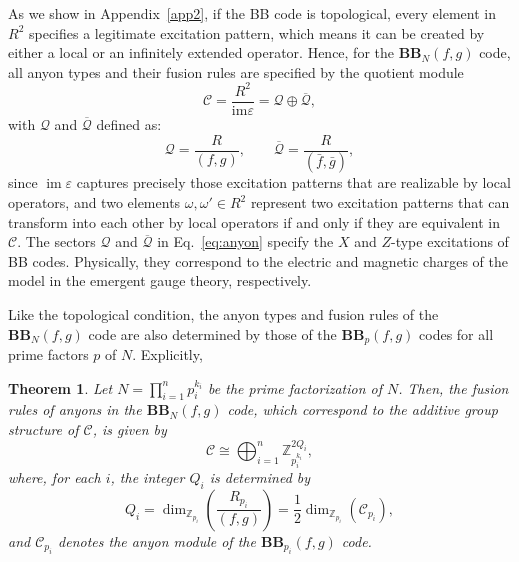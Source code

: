 \documentclass[aps,prb,english,superscriptaddress,twocolumn,tightenlines,showpacs,longbibliography,floatfix,amsfonts]{revtex4-2}
\newcommand{\im}{\operatorname{im}}
\newcommand{\eps}{\varepsilon}
\newtheorem{thm}{Theorem}
\begin{document}
As we show in Appendix~\ref{app2}, if the BB code is topological, every element in $R^2$ specifies a legitimate excitation pattern,  which means it can be created by either a local or an infinitely extended operator. Hence, for the $\mathbf{BB}_N(f,g)$ code, all anyon types and their fusion rules are specified by the quotient module
\begin{equation}
    \mathcal{C}=\frac{R^{2}}{\mathrm{im}\eps}=\mathcal{Q}\oplus\overline{\mathcal{Q}},\label{eq:anyon}
\end{equation}
with $\mathcal{Q}$ and $\overline{\mathcal{Q}}$ defined as:
\begin{equation}
    \mathcal{Q}=\frac{R}{\left(f,g\right)},\qquad\overline{\mathcal{Q}}=\frac{R}{(\bar{f},\bar{g})},
\end{equation}
since $\im\eps$ captures precisely those excitation patterns that are realizable by local operators, and two elements $\omega,\omega'\in R^2$ represent two excitation patterns that can transform into each other by local operators if and only if they are equivalent in $\mathcal{C}$. The sectors $\mathcal{Q}$ and $\overline{\mathcal{Q}}$ in Eq.~\eqref{eq:anyon} specify the $X$ and $Z$-type excitations of BB codes. Physically, they correspond to the electric and magnetic charges of the model in the emergent gauge theory, respectively.
  
Like the topological condition, the anyon types and fusion rules of the $\mathbf{BB}_N(f,g)$ code are also determined by those of the $\mathbf{BB}_p(f,g)$ codes for all prime factors $p$ of $N$. Explicitly,

\begin{thm}
Let $N=\prod_{i=1}^n p_i^{k_i}$ be the prime factorization of $N$.
Then, the fusion rules of anyons in the $\mathbf{BB}_N(f,g)$ code, which correspond to the additive group structure of $\mathcal{C}$, is given by
\begin{equation}
\mathcal{C} \cong \bigoplus_{i=1}^{n} \mathbb{Z}_{p_i^{k_i}}^{2Q_i}, \label{eq:anyon_relation}
\end{equation}
where, for each $i$, the integer $Q_i$ is determined by
\begin{equation}
Q_i = \dim_{\mathbb{Z}_{p_i}}\left(\frac{R_{p_i}}{(f,g)}\right)
= \frac{1}{2}\dim_{\mathbb{Z}_{p_i}}(\mathcal{C}_{p_i}),
\end{equation}
and $\mathcal{C}_{p_i}$ denotes the anyon module of the $\mathbf{BB}_{p_i}(f,g)$ code.
\label{thm:anyon_type_relation}
\end{thm}
\end{document}
